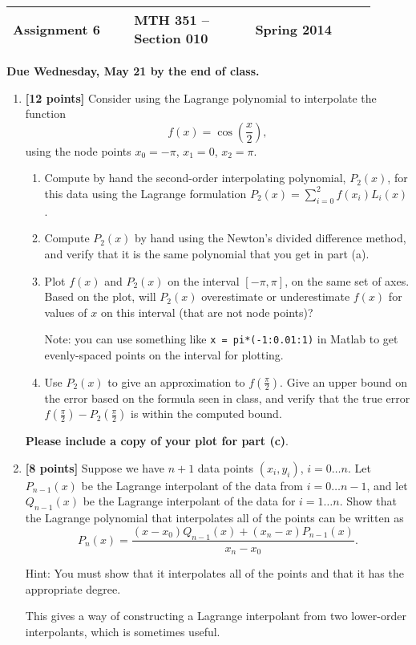 \documentclass{article}
\newcommand{\myspace}{0.4cm}
\begin{document}
\begin{center}

\large
\begin{tabular}{L{0.3\linewidth} C{0.3\linewidth} R{0.3\linewidth}}
\hline
Assignment 6	&MTH 351 -- Section 010		&Spring 2014 \\
\hline
\end{tabular}

\vspace{\myspace}

{\bf Due Wednesday, May 21 by the end of class.}
\end{center}

\begin{enumerate}

\item {\bf [12 points]} Consider using the Lagrange polynomial to interpolate the function
\begin{equation*}
f(x) = \cos \left( \frac{x}{2} \right),
\end{equation*} 
using the node points $x_0 = -\pi$, $x_1 = 0$,  $x_2 = \pi$.
\begin{enumerate}
\item Compute by hand the second-order interpolating polynomial, $P_2(x)$, for this data using the Lagrange formulation $\displaystyle P_2(x) = \sum_{i=0}^2 f(x_i) L_i(x)$.
\item Compute $P_2(x)$ by hand using the Newton's divided difference method, and verify that it is the same polynomial that you get in part (a).
\item Plot $f(x)$ and $P_2(x)$ on the interval $[-\pi, \pi]$, on the same set of axes. Based on the plot, will $P_2(x)$ overestimate or underestimate $f(x)$ for values of $x$ on this interval (that are not node points)? 

Note: you can use something like {\tt x = pi*(-1:0.01:1)} in Matlab to get evenly-spaced points on the interval for plotting.

\item  Use $P_2(x)$ to give an approximation to $\displaystyle f\left(\frac{\pi}{2}\right)$. Give an upper bound on the error based on the formula seen in class, and verify that the true error $\displaystyle f \left( \frac{\pi}{2}\right) - P_2\left( \frac{\pi}{2}\right)$ is within the computed bound.
\end{enumerate}
{\bf Please include a copy of your plot for part (c)}.

\medskip

\item  {\bf [8 points]} Suppose we have $n+1$ data points $(x_i, y_i)$, $i=0 \dots n$. Let $P_{n-1} (x)$ be the Lagrange interpolant of the data from $i=0 \dots n-1$, and let $Q_{n-1}(x)$ be the Lagrange interpolant of the data for $i = 1 \dots n$. Show that the Lagrange polynomial that interpolates all of the points can be written as
\begin{equation*}
P_n(x) = \frac{ (x-x_0)Q_{n-1}(x) + (x_n-x) P_{n-1}(x)}{x_n - x_0}.
\end{equation*}

Hint: You must show that it interpolates all of the points and that it has the appropriate degree.

This gives a way of constructing a Lagrange interpolant from two lower-order interpolants, which is sometimes useful.

\end{enumerate}
\end{document}
